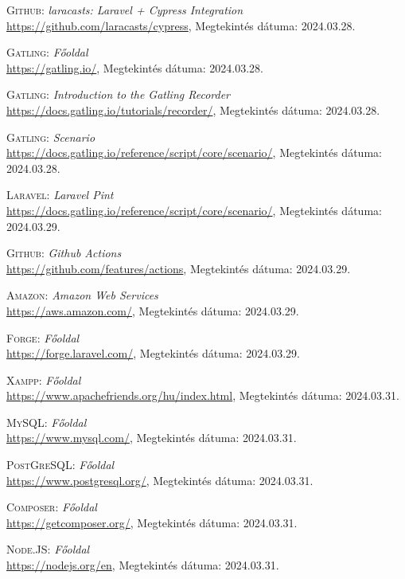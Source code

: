 \documentclass[
]{thesis-ekf}
\theoremstyle{definition}
\theoremstyle{remark}
\begin{document}
\begin{thebibliography}{47}
\textsc{Github}: \emph{laracasts: Laravel + Cypress Integration}
\\
\url{https://github.com/laracasts/cypress}, Megtekintés dátuma: 2024.03.28.

\textsc{Gatling}: \emph{Főoldal}
\\
\url{https://gatling.io/}, Megtekintés dátuma: 2024.03.28.

\textsc{Gatling}: \emph{Introduction to the Gatling Recorder}
\\
\url{https://docs.gatling.io/tutorials/recorder/}, Megtekintés dátuma: 2024.03.28.

\textsc{Gatling}: \emph{Scenario}
\\
\url{https://docs.gatling.io/reference/script/core/scenario/}, Megtekintés dátuma: 2024.03.28.

\textsc{Laravel}: \emph{Laravel Pint}
\\
\url{https://docs.gatling.io/reference/script/core/scenario/}, Megtekintés dátuma: 2024.03.29.

\textsc{Github}: \emph{Github Actions}
\\
\url{https://github.com/features/actions}, Megtekintés dátuma: 2024.03.29.

\textsc{Amazon}: \emph{Amazon Web Services}
\\
\url{https://aws.amazon.com/}, Megtekintés dátuma: 2024.03.29.

\textsc{Forge}: \emph{Főoldal}
\\
\url{https://forge.laravel.com/}, Megtekintés dátuma: 2024.03.29.

\textsc{Xampp}: \emph{Főoldal}
\\
\url{https://www.apachefriends.org/hu/index.html}, Megtekintés dátuma: 2024.03.31.

\textsc{MySQL}: \emph{Főoldal}
\\
\url{https://www.mysql.com/}, Megtekintés dátuma: 2024.03.31.

\textsc{PostGreSQL}: \emph{Főoldal}
\\
\url{https://www.postgresql.org/}, Megtekintés dátuma: 2024.03.31.

\textsc{Composer}: \emph{Főoldal}
\\
\url{https://getcomposer.org/}, Megtekintés dátuma: 2024.03.31.

\textsc{Node.JS}: \emph{Főoldal}
\\
\url{https://nodejs.org/en}, Megtekintés dátuma: 2024.03.31.


\end{thebibliography}


\end{document}
